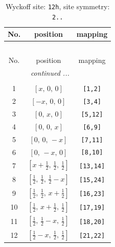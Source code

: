 \documentclass[fleqn,8pt]{jsarticle}
\begin{document}
\begin{longtable}{ccc}
\caption{Wyckoff site: {\tt 12h}, site symmetry: {\tt 2..}}
 \\
 \hline \hline
No. & position & mapping \\ \hline \endfirsthead

\multicolumn{2}{l}{\tablename\ \thetable{}} \\
 \hline \hline
No. & position & mapping \\ \hline \endhead

 \hline \hline
\multicolumn{2}{r}{\footnotesize\it continued ...} \\ \endfoot

 \hline \hline
\multicolumn{2}{r}{} \\ \endlastfoot

1 & $\left[ x,\, 0,\, 0 \right]$ & {\tt [1,2]} \\ \hline
2 & $\left[ - x,\, 0,\, 0 \right]$ & {\tt [3,4]} \\ \hline
3 & $\left[ 0,\, x,\, 0 \right]$ & {\tt [5,12]} \\ \hline
4 & $\left[ 0,\, 0,\, x \right]$ & {\tt [6,9]} \\ \hline
5 & $\left[ 0,\, 0,\, - x \right]$ & {\tt [7,11]} \\ \hline
6 & $\left[ 0,\, - x,\, 0 \right]$ & {\tt [8,10]} \\ \hline
7 & $\left[ x + \frac{1}{2},\, \frac{1}{2},\, \frac{1}{2} \right]$ & {\tt [13,14]} \\ \hline
8 & $\left[ \frac{1}{2},\, \frac{1}{2},\, \frac{1}{2} - x \right]$ & {\tt [15,24]} \\ \hline
9 & $\left[ \frac{1}{2},\, \frac{1}{2},\, x + \frac{1}{2} \right]$ & {\tt [16,23]} \\ \hline
10 & $\left[ \frac{1}{2},\, x + \frac{1}{2},\, \frac{1}{2} \right]$ & {\tt [17,19]} \\ \hline
11 & $\left[ \frac{1}{2},\, \frac{1}{2} - x,\, \frac{1}{2} \right]$ & {\tt [18,20]} \\ \hline
12 & $\left[ \frac{1}{2} - x,\, \frac{1}{2},\, \frac{1}{2} \right]$ & {\tt [21,22]} \\
\end{longtable}
\renewcommand{\arraystretch}{1.2}
\end{document}
